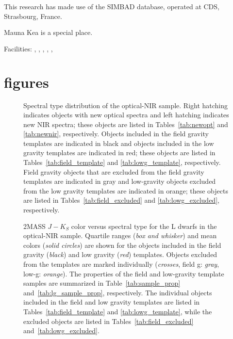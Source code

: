 \documentclass[12pt,preprint]{aastex}
\begin{document}
This research has made use of the SIMBAD database, operated at CDS, Strasbourg, France.

Mauna Kea is a special place.

Facilities: 
, 
,
, 
,
, 
                                     

%


\clearpage 
\section{figures}

\begin{figure}
		\caption{Spectral type distribution of the optical-NIR sample. 
		Right hatching indicates objects with new optical spectra and left hatching indicates new NIR spectra; these objects are listed in Tables~\ref{tab:newopt} and \ref{tab:newnir}, respectively.
		Objects included in the field gravity templates are indicated in black and objects included in the low gravity templates are indicated in red; these objects are listed in Tables~\ref{tab:field_template} and \ref{tab:lowg_template}, respectively.
		Field gravity objects that are excluded from the field gravity templates are indicated in gray and low-gravity objects excluded from the low gravity templates are indicated in orange; these objects are listed in Tables~\ref{tab:field_excluded} and \ref{tab:lowg_excluded}, respectively.
		}
	\label{fig:newdata_spthist}
\end{figure}

\begin{figure}
		\caption{2MASS $J-K_S$ color versus spectral type for the L dwarfs in the optical-NIR sample. 
		Quartile ranges (\emph{box and whisker}) and mean colors (\emph{solid circles}) are shown for the objects included in the field gravity (\emph{black}) and low gravity (\emph{red}) templates. 
		Objects excluded from the templates are marked individually (\emph{crosses}, field g: \emph{gray}, low-g: \emph{orange}).
		The properties of the field and low-gravity template samples are summarized in Table~\ref{tab:sample_prop} and~\ref{tab:lg_sample_prop}, respectively. The individual objects included in the field and low gravity templates are listed in Tables~\ref{tab:field_template} and \ref{tab:lowg_template}, while the excluded objects are listed in Tables~\ref{tab:field_excluded} and~\ref{tab:lowg_excluded}. }
	\label{fig:JK_colors}
\end{figure}
\end{document}
